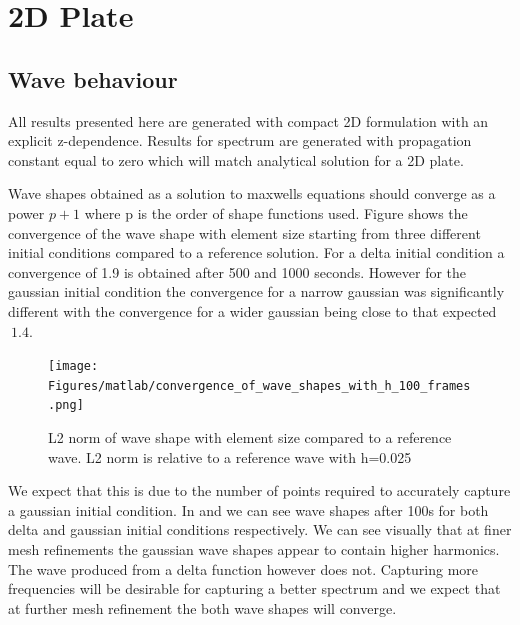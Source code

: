 
\chapter{2D Plate} %

\section{Wave behaviour}

All results presented here are generated with compact 2D formulation with an explicit z-dependence. Results for spectrum are generated with propagation constant equal to zero which will match analytical solution for a 2D plate.

Wave shapes obtained as a solution to maxwells equations should converge as a power $p+1$ where p is the order of shape functions used. Figure  shows the convergence of the wave shape with element size starting from three different initial conditions compared to a reference solution. For a delta initial condition a convergence of 1.9 is obtained after 500 and 1000 seconds. However for the gaussian initial condition the convergence for a narrow gaussian was significantly different with the convergence for a wider gaussian being close to that expected $~ 1.4$.

\begin{figure}
\texttt{[image: Figures/matlab/convergence\_of\_wave\_shapes\_with\_h\_100\_frames.png]}
\caption{L2 norm of wave shape with element size compared to a reference wave. L2 norm is relative to a reference wave with h=0.025}
\label{WaveConv2}
\end{figure}

We expect that this is due to the number of points required to accurately capture a gaussian initial condition. In  and  we can see wave shapes after 100s for both delta and gaussian initial conditions respectively. We can see visually that at finer mesh refinements the gaussian wave shapes appear to contain higher harmonics. The wave produced from a delta function however does not. Capturing more frequencies will be desirable for capturing a better spectrum and we expect that at further mesh refinement the both wave shapes will converge.

